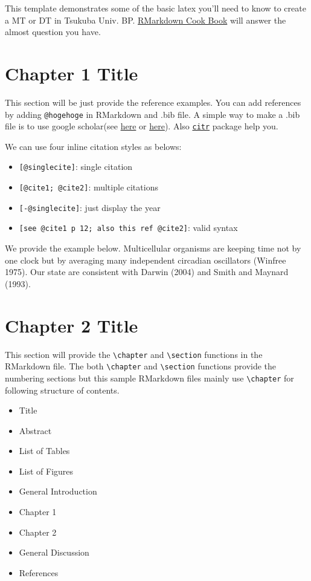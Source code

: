 \documentclass[12pt, a4paper]{report} %
\providecommand{\tightlist}{%
  \setlength{\itemsep}{0pt}\setlength{\parskip}{0pt}}
\begin{document}
This template demonstrates some of the basic latex you'll need to know
to create a MT or DT in Tsukuba Univ. BP.
\href{https://bookdown.org/yihui/rmarkdown-cookbook/}{RMarkdown Cook
Book} will answer the almost question you have.

\chapter{Chapter 1 Title}
\label{Chap1}

This section will be just provide the reference examples. You can add
references by adding \texttt{@hogehoge} in RMarkdown and .bib file. A
simple way to make a .bib file is to use google scholar(see
\href{https://digitalmeasures.oregonstate.edu/training/export-bibtex-google-scholar}{here}
or
\href{http://ajdkbsuvi.blogspot.com/2011/02/google-scholarbibtex.html}{here}).
Also \href{https://github.com/crsh/citr}{\texttt{citr}} package help
you.

We can use four inline citation styles as belows:

\begin{itemize}
\tightlist
\item
  \texttt{{[}@singlecite{]}}: single citation
\item
  \texttt{{[}@cite1;\ @cite2{]}}: multiple citations
\item
  \texttt{{[}-@singlecite{]}}: just display the year
\item
  \texttt{{[}see\ @cite1\ p\ 12;\ also\ this\ ref\ @cite2{]}}: valid
  syntax
\end{itemize}

We provide the example below. Multicellular organisms are keeping time
not by one clock but by averaging many independent circadian oscillators
(Winfree 1975). Our state are consistent with Darwin (2004) and Smith
and Maynard (1993).

\chapter{Chapter 2 Title}
\label{Chap2}

This section will provide the \texttt{\textbackslash{}chapter} and
\texttt{\textbackslash{}section} functions in the RMarkdown file. The
both \texttt{\textbackslash{}chapter} and
\texttt{\textbackslash{}section} functions provide the numbering
sections but this sample RMarkdown files mainly use
\texttt{\textbackslash{}chapter} for following structure of contents.

\begin{itemize}
\tightlist
\item
  Title
\item
  Abstract
\item
  List of Tables
\item
  List of Figures
\item
  General Introduction
\item
  Chapter 1
\item
  Chapter 2
\item
  General Discussion
\item
  References
\end{itemize}
\end{document}
